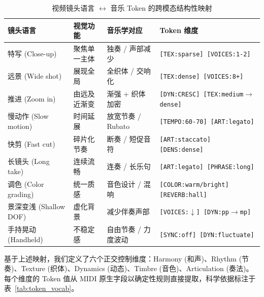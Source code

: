 \documentclass[11pt]{article}
\begin{document}
\begin{table}[t]
\centering\small
\caption{视频镜头语言 $\leftrightarrow$ 音乐 Token 的跨模态结构性映射}
\label{tab:mapping}
\begin{tabularx}{\textwidth}{@{}l >{\raggedright\arraybackslash}X l >{\raggedright\arraybackslash}X@{}}
\toprule
\textbf{镜头语言} & \textbf{视觉功能} & \textbf{音乐学对应} & \textbf{Token 维度} \\
\midrule
特写 (Close-up) & 聚焦单一主体 & 独奏 / 声部减少 & \texttt{[TEX:sparse] [VOICES:1-2]} \\
远景 (Wide shot) & 展现全局 & 全织体 / 交响化 & \texttt{[TEX:dense] [VOICES:8+]} \\
推进 (Zoom in) & 由远及近渐变 & 渐强 + 织体加密 & \texttt{[DYN:CRESC] [TEX:medium$\to$dense]} \\
慢动作 (Slow motion) & 时间延展 & 放宽节奏 / Rubato & \texttt{[TEMPO:60-70] [ART:legato]} \\
快剪 (Fast cut) & 碎片化节奏 & 断奏 / 短促音符 & \texttt{[ART:staccato] [DENS:dense]} \\
长镜头 (Long take) & 连续流畅 & 连奏 / 长乐句 & \texttt{[ART:legato] [PHRASE:long]} \\
调色 (Color grading) & 统一质感 & 音色设计 / 混响 & \texttt{[COLOR:warm/bright] [REVERB:hall]} \\
景深变浅 (Shallow DOF) & 虚化背景 & 减少伴奏声部 & \texttt{[VOICES:$\downarrow$] [DYN:pp$\to$mp]} \\
手持晃动 (Handheld) & 不稳定感 & 自由节奏 / 力度波动 & \texttt{[SYNC:off] [DYN:fluctuate]} \\
\bottomrule
\end{tabularx}
\end{table}

基于上述映射，我们定义了六个正交控制维度：Harmony (和声)、Rhythm (节奏)、Texture (织体)、Dynamics (动态)、Timbre (音色)、Articulation (奏法)。每个维度的 Token 值从 MIDI 原生字段以确定性规则直接提取，科学依据标注于表~\ref{tab:token_vocab}。
\end{document}
